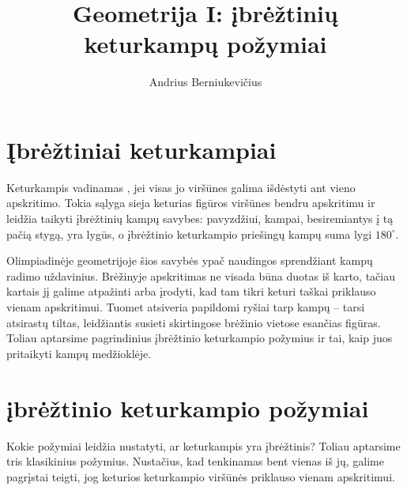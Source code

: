 \documentclass[11pt,a4paper]{scrartcl}
\title{Geometrija I: įbrėžtinių keturkampų požymiai}
\author{Andrius Berniukevičius}
\begin{document}
\setlength{\parskip}{0.25\baselineskip}
\setlength{\abovedisplayskip}{8pt plus 2pt minus 2pt}
\setlength{\belowdisplayskip}{8pt plus 2pt minus 2pt}
\maketitle
\section{Įbrėžtiniai keturkampiai}
Keturkampis vadinamas , jei visas jo viršūnes galima išdėstyti ant vieno apskritimo. Tokia sąlyga sieja keturias figūros viršūnes bendru apskritimu ir leidžia taikyti įbrėžtinių kampų savybes: pavyzdžiui, kampai, besiremiantys į tą pačią stygą, yra lygūs, o įbrėžtinio keturkampio priešingų kampų suma lygi $180^\circ$.

Olimpiadinėje geometrijoje šios savybės ypač naudingos sprendžiant kampų radimo uždavinius. Brėžinyje apskritimas ne visada būna duotas iš karto, tačiau kartais jį galime atpažinti arba įrodyti, kad tam tikri keturi taškai priklauso vienam apskritimui. Tuomet atsiveria papildomi ryšiai tarp kampų – tarsi atsirastų tiltas, leidžiantis susieti skirtingose brėžinio vietose esančias figūras. Toliau aptarsime pagrindinius įbrėžtinio keturkampio požymius ir tai, kaip juos pritaikyti kampų medžioklėje.
\section{įbrėžtinio keturkampio požymiai}
Kokie požymiai leidžia nustatyti, ar keturkampis yra įbrėžtinis? Toliau aptarsime tris klasikinius požymius. Nustačius, kad tenkinamas bent vienas iš jų, galime pagrįstai teigti, jog keturios keturkampio viršūnės priklauso vienam apskritimui.
\end{document}
